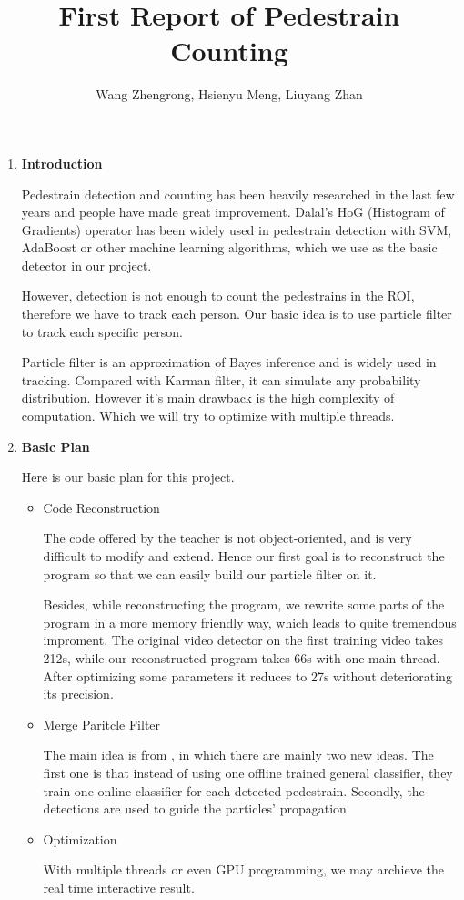 \documentclass[a4paper]{article}
\title{First Report of Pedestrain Counting}
\author{Wang Zhengrong, Hsienyu Meng, Liuyang Zhan}
\begin{document}
\maketitle
\begin{enumerate}
\item \textbf{Introduction}

Pedestrain detection and counting has been heavily researched in the last few years and people have made great improvement. Dalal's HoG (Histogram of Gradients) operator has been widely used in pedestrain detection with SVM, AdaBoost or other machine learning algorithms, which we use as the basic detector in our project.

However, detection is not enough to count the pedestrains in the ROI, therefore we have to track each person. Our basic idea is to use particle filter to track each specific person.

Particle filter is an approximation of Bayes inference and is widely used in tracking. Compared with Karman filter, it can simulate any probability distribution. However it's main drawback is the high complexity of computation. Which we will try to optimize with multiple threads.

\item \textbf{Basic Plan}

Here is our basic plan for this project.

\begin{itemize}
\item Code Reconstruction

The code offered by the teacher is not object-oriented, and is very difficult to modify and extend. Hence our first goal is to reconstruct the program so that we can easily build our particle filter on it.

Besides, while reconstructing the program, we rewrite some parts of the program in a more memory friendly way, which leads to quite tremendous improment. The original video detector on the first training video takes 212s, while our reconstructed program takes 66s with one main thread. After optimizing some parameters it reduces to 27s without deteriorating its precision.

\item Merge Paritcle Filter

The main idea is from \cite{eth_biwi_00633}, in which there are mainly two new ideas. The first one is that instead of using one offline trained general classifier, they train one online classifier for each detected pedestrain. Secondly, the detections are used to guide the particles' propagation.

\item Optimization

With multiple threads or even GPU programming, we may archieve the real time interactive result.


\end{itemize}

\end{enumerate}

\clearpage


\end{document}
